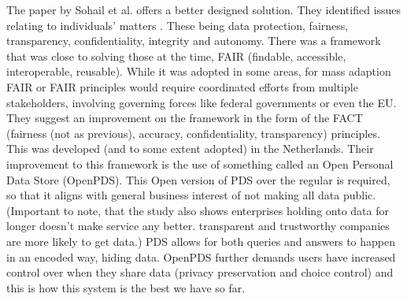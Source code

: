 \documentclass[english, 12pt, a4paper, sci, utf8, a-2b, online]{aaltothesis}
\theoremstyle{change}
\theoremstyle{theoremstyle}
\begin{document}
The paper by Sohail et al. offers a better designed solution. They identified issues relating to individuals' matters \cite{sohail2024data}. These being data protection, fairness, transparency, confidentiality, integrity and autonomy. There was a framework that was close to solving those at the time, FAIR (findable, accessible, interoperable, reusable). While it was adopted in some areas, for mass adaption FAIR or FAIR principles would require coordinated efforts from multiple stakeholders, involving governing forces like federal governments or even the EU. They suggest an improvement on the framework in the form of the FACT (fairness (not as previous), accuracy, confidentiality, transparency) principles. This was developed (and to some extent adopted) in the Netherlands. Their improvement to this framework is the use of something called an Open Personal Data Store (OpenPDS). This Open version of PDS over the regular is required, so that it aligns with general business interest of not making all data public. (Important to note, that the study also shows enterprises holding onto data for longer doesn't make service any better. transparent and trustworthy companies are more likely to get data.) PDS allows for both queries and answers to happen in an encoded way, hiding data. OpenPDS further demands users have increased control over when they share data (privacy preservation and choice control) and this is how this system is the best we have so far.
\end{document}
